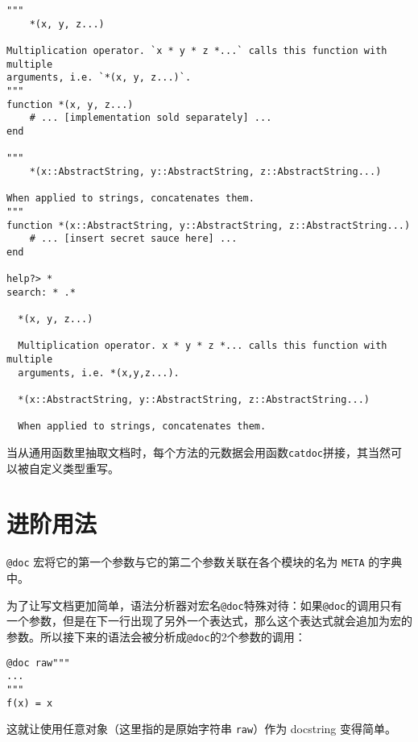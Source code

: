 \begin{verbatim}
"""
    *(x, y, z...)

Multiplication operator. `x * y * z *...` calls this function with multiple
arguments, i.e. `*(x, y, z...)`.
"""
function *(x, y, z...)
    # ... [implementation sold separately] ...
end

"""
    *(x::AbstractString, y::AbstractString, z::AbstractString...)

When applied to strings, concatenates them.
"""
function *(x::AbstractString, y::AbstractString, z::AbstractString...)
    # ... [insert secret sauce here] ...
end

help?> *
search: * .*

  *(x, y, z...)

  Multiplication operator. x * y * z *... calls this function with multiple
  arguments, i.e. *(x,y,z...).

  *(x::AbstractString, y::AbstractString, z::AbstractString...)

  When applied to strings, concatenates them.
\end{verbatim}



当从通用函数里抽取文档时，每个方法的元数据会用函数\texttt{catdoc}拼接，其当然可以被自定义类型重写。



\hypertarget{9947466122062338539}{}


\section{进阶用法}



\texttt{@doc} 宏将它的第一个参数与它的第二个参数关联在各个模块的名为 \texttt{META} 的字典中。



为了让写文档更加简单，语法分析器对宏名\texttt{@doc}特殊对待：如果\texttt{@doc}的调用只有一个参数，但是在下一行出现了另外一个表达式，那么这个表达式就会追加为宏的参数。所以接下来的语法会被分析成\texttt{@doc}的2个参数的调用：




\begin{verbatim}
@doc raw"""
...
"""
f(x) = x
\end{verbatim}



这就让使用任意对象（这里指的是原始字符串 \texttt{raw{\textquotedbl}{\textquotedbl}}）作为 docstring 变得简单。



